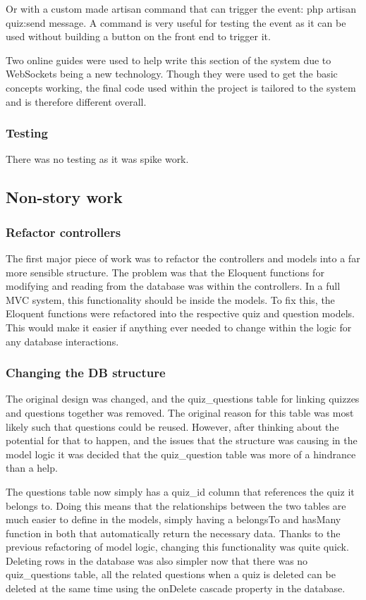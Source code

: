 Or with a custom made artisan command that can trigger the event: php artisan quiz:send {message}. A command is very useful for testing the event as it can be used without building a button on the front end to trigger it.

Two online guides were used to help write this section of the system due to WebSockets being a new technology\cite{pusher-guide}\cite{echo-guide}. Though they were used to get the basic concepts working, the final code used within the project is tailored to the system and is therefore different overall.
\subsubsection{Testing}
There was no testing as it was spike work.
\newpage

\subsection{Non-story work}
\subsubsection{Refactor controllers}
The first major piece of work was to refactor the controllers and models into a far more sensible structure. The problem was that the Eloquent functions for modifying and reading from the database was within the controllers. In a full MVC system, this functionality should be inside the models. To fix this, the Eloquent functions were refactored into the respective quiz and question models. This would make it easier if anything ever needed to change within the logic for any database interactions.
\subsubsection{Changing the DB structure}
The original design was changed, and the quiz\_questions table for linking quizzes and questions together was removed. The original reason for this table was most likely such that questions could be reused. However, after thinking about the potential for that to happen, and the issues that the structure was causing in the model logic it was decided that the quiz\_question table was more of a hindrance than a help.

The questions table now simply has a quiz\_id column that references the quiz it belongs to. Doing this means that the relationships between the two tables are much easier to define in the models, simply having a belongsTo and hasMany function in both that automatically return the necessary data. Thanks to the previous refactoring of model logic, changing this functionality was quite quick. Deleting rows in the database was also simpler now that there was no quiz\_questions table, all the related questions when a quiz is deleted can be deleted at the same time using the onDelete cascade property in the database.
